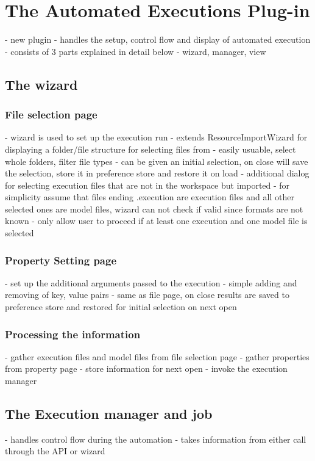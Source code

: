 \chapter{The Automated Executions Plug-in}
- new plugin
- handles the setup, control flow and display of automated execution
- consists of 3 parts explained in detail below
- wizard, manager, view
\section{The wizard}
\subsection{File selection page}
- wizard is used to set up the execution run
- extends ResourceImportWizard for displaying a folder/file structure for selecting files from
- easily usuable, select whole folders, filter file types
- can be given an initial selection, on close will save the selection, store it in preference store
and restore it on load
- additional dialog for selecting execution files that are not in the workspace but imported
- for simplicity assume that files ending .execution are execution files and all other selected
ones are model files, wizard can not check if valid since formats are not known
- only allow user to proceed if at least one execution and one model file is selected
\subsection{Property Setting page}
- set up the additional arguments passed to the execution
- simple adding and removing of key, value pairs
- same as file page, on close results are saved to preference store and restored for initial
selection on next open
\subsection{Processing the information}
- gather execution files and model files from file selection page
- gather properties from property page
- store information for next open
- invoke the execution manager

\section{The Execution manager and job}
- handles control flow during the automation
- takes information from either call through the API or wizard

